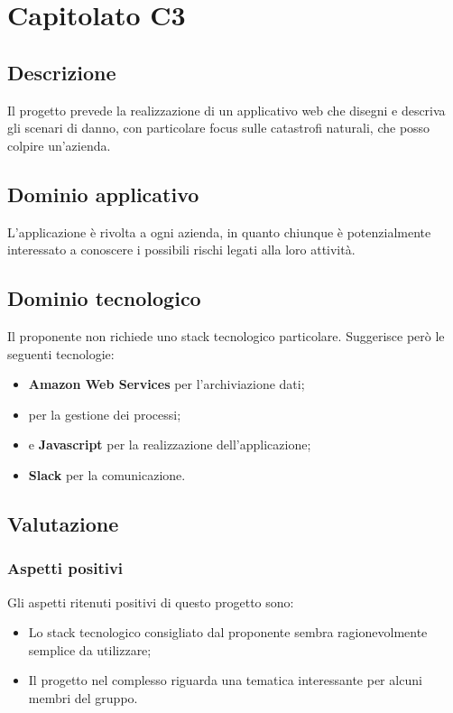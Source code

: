 \documentclass[../StudioDiFattibilita.tex]{subfiles}
\begin{document}
	\section{Capitolato C3}
		\subsection{Descrizione}
			Il progetto prevede la realizzazione di un applicativo web che disegni e descriva gli scenari di danno, con particolare focus sulle catastrofi naturali, che posso colpire un'azienda.
		\subsection{Dominio applicativo}
			L'applicazione è rivolta a ogni azienda, in quanto chiunque è potenzialmente interessato a conoscere i possibili rischi legati alla loro attività.
		\subsection{Dominio tecnologico}
			Il proponente non richiede uno stack tecnologico particolare. Suggerisce però le seguenti tecnologie:
			\begin{itemize}
				\item \textbf{Amazon Web Services} per l'archiviazione dati;
				\item \textbf{} per la gestione dei processi;
				\item \textbf{} e \textbf{Javascript} per la realizzazione dell'applicazione;
				\item \textbf{Slack} per la comunicazione.
			\end{itemize}
		\subsection{Valutazione}
			\subsubsection{Aspetti positivi}
				Gli aspetti ritenuti positivi di questo progetto sono:
				\begin{itemize}
					\item Lo stack tecnologico consigliato dal proponente sembra ragionevolmente semplice da utilizzare;
					\item Il progetto nel complesso riguarda una tematica interessante per alcuni membri del gruppo.
				\end{itemize}					
\end{document}
